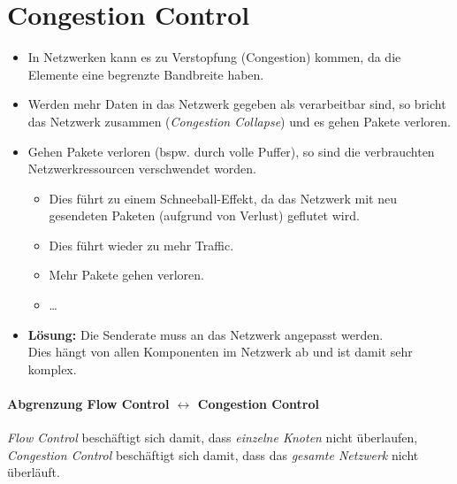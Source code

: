 \documentclass[a4paper, 11pt, accentcolor = tud3b]{tudreport}
\begin{document}
        \section{Congestion Control}
            \begin{itemize}
            	\item In Netzwerken kann es zu Verstopfung (Congestion) kommen, da die Elemente eine begrenzte Bandbreite haben.
            	\item Werden mehr Daten in das Netzwerk gegeben als verarbeitbar sind, so bricht das Netzwerk zusammen (\textit{Congestion Collapse}) und es gehen Pakete verloren.
            	\item Gehen Pakete verloren (bspw. durch volle Puffer), so sind die verbrauchten Netzwerkressourcen verschwendet worden.
	            	\begin{itemize}
	            		\item Dies führt zu einem Schneeball-Effekt, da das Netzwerk mit neu gesendeten Paketen (aufgrund von Verlust) geflutet wird.
	            		\item Dies führt wieder zu mehr Traffic.
	            		\item Mehr Pakete gehen verloren.
	            		\item \dots
	            	\end{itemize}
	            \item \textbf{Lösung:} Die Senderate muss an das Netzwerk angepasst werden. \\ Dies hängt von allen Komponenten im Netzwerk ab und ist damit sehr komplex.
            \end{itemize}
            
            \paragraph{Abgrenzung Flow Control \( \leftrightarrow \) Congestion Control}
	            \textit{Flow Control} beschäftigt sich damit, dass \textit{einzelne Knoten} nicht überlaufen, \\
	            \indent \textit{Congestion Control} beschäftigt sich damit, dass das \textit{gesamte Netzwerk} nicht überläuft.
\end{document}
